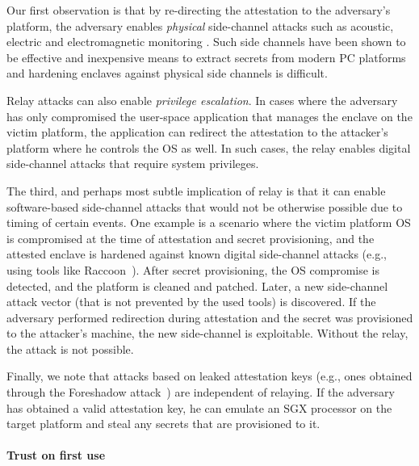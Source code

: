 
Our first observation is that by re-directing the attestation to the adversary's platform, the adversary enables \emph{physical} side-channel attacks such as acoustic, electric and electromagnetic monitoring . Such side channels have been shown to be effective and inexpensive means to extract secrets from modern PC platforms~\cite{genkin2016physical} and hardening enclaves against physical side channels is difficult. 

Relay attacks can also enable \emph{privilege escalation}. In cases where the adversary has only compromised the user-space application that manages the enclave on the victim platform, the application can redirect the attestation to the attacker's platform where he controls the OS as well. In such cases, the relay enables digital side-channel attacks that require system privileges.

The third, and perhaps most subtle implication of relay is that it can enable software-based side-channel attacks that would not be otherwise possible due to timing of certain events. One example is a scenario where the victim platform OS is compromised at the time of attestation and secret provisioning, and the attested enclave is hardened against known digital side-channel attacks (e.g., using tools like Raccoon~\cite{raccoon}). After secret provisioning, the OS compromise is detected, and the platform is cleaned and patched. Later, a new side-channel attack vector (that is not prevented by the used tools) is discovered. If the adversary performed redirection during attestation and the secret was provisioned to the attacker's machine, the new side-channel is exploitable. Without the relay, the attack is not possible. 

Finally, we note that attacks based on leaked attestation keys (e.g., ones obtained through the Foreshadow attack~\cite{van2018foreshadow}) are independent of relaying. If the adversary has obtained a valid attestation key, he can emulate an SGX processor on the target platform and steal any secrets that are provisioned to it.


\paragraph{Trust on first use}

